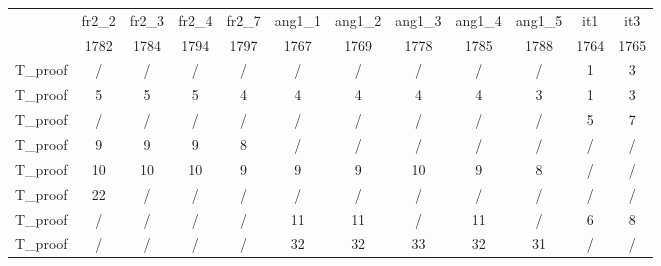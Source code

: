 \begin{table}
\centering
\caption{Échantillon du tableau d’alignement simple avec l’identifiant \og~T\_proof~\fg{}}
\begin{longtable}{|c|c|c|c|c|c|c|c|c|c|c|c|}
\hline

 & fr2\_2 & fr2\_3 & fr2\_4 & fr2\_7 & ang1\_1 & ang1\_2 & ang1\_3 & ang1\_4 & ang1\_5 & it1 & it3 \\
 & 1782 & 1784 & 1794 & 1797 & 1767 & 1769 & 1778 & 1785 & 1788 & 1764 & 1765 \\ \hline
T\_proof & / & / & / & / & / & / & / & / & / & 1 & 3 \\ \hline
T\_proof & 5 & 5 & 5 & 4 & 4 & 4 & 4 & 4 & 3 & 1 & 3 \\ \hline
T\_proof & / & / & / & / & / & / & / & / & / & 5 & 7 \\ \hline
T\_proof & 9 & 9 & 9 & 8 & / & / & / & / & / & / & / \\ \hline
T\_proof & 10 & 10 & 10 & 9 & 9 & 9 & 10 & 9 & 8 & / & / \\ \hline
T\_proof & 22 & / & / & / & / & / & / & / & / & / & / \\ \hline
T\_proof & / & / & / & / & 11 & 11 & / & 11 & / & 6 & 8 \\ \hline
T\_proof & / & / & / & / & 32 & 32 & 33 & 32 & 31 & / & / \\ \hline

\end{longtable}
\label{table:alignement_simple}
\end{table}